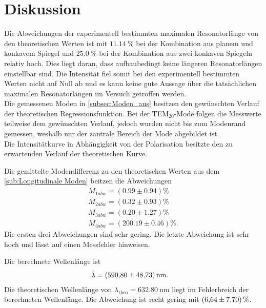 \section{Diskussion}
\label{sec:Diskussion}

Die Abweichungen der experimentell bestimmten maximalen Resonatorlänge von den theoretischen Werten ist mit $\qty{11.14}{\percent}$ bei der Kombination
aus planem und konkavem Spiegel und $\qty{25.0}{\percent}$ bei der Kombination aus zwei konkaven Spiegeln relativ hoch.
Dies liegt daran, dass aufbaubedingt keine längeren Resonatorlängen einstellbar sind. Die Intensität fiel somit bei den experimentell bestimmten
Werten nicht auf Null ab und es kann keine gute Aussage über die tatsächlichen maximalen Resonatorlängen im Versuch getroffen werden.\\

Die gemessenen Moden in \autoref{subsec:Moden_aus} besitzen den gewünschten Verlauf der theoretischen Regressionsfunktion. Bei der TEM$_{20}$-Mode folgen die Messwerte teilweise dem gewünschten 
Verlauf, jedoch wurden nicht bis zum Modenrand gemessen, weshalb nur der zantrale Bereich der Mode abgebildet ist.\\


Die Intensitätkurve in Abhängigkeit von der Polarisation besitzte den zu erwartenden Verlauf der theoretischen Kurve.

Die gemittelte Modendifferenz zu den theoretischen Werten aus dem \autoref{sub:Longitudinale Moden} beitzen die Abweichungen
\begin{align}
    M_{1 abw} = (0.99 \pm 0.94) \si{\percent}\\
    M_{2 abw} = (0.32 \pm 0.93) \si{\percent}\\
    M_{3 abw} = (0.20 \pm 1.27) \si{\percent}\\
    M_{4 abw} = (200.19 \pm 0.46) \si{\percent}.
\end{align}
Die ersten drei Abweichungen sind sehr gering. Die letzte Abweichung ist sehr hoch und lässt auf einen Messfehler hinweisen.

Die berechnete Wellenlänge ist 
\begin{align*}
    \bar{\lambda} &= \qty{590.80 \pm 48.73}{\nano\meter}.
\end{align*}
Die theoretischen Wellenlänge von $\lambda_{\text{theo}}= \qty{632.80}{\nano\meter}$ liegt im Fehlerbreich der berechneten Wellenlänge. Die Abweichung ist recht gering mit 
$\qty{6.64 \pm 7.70}{\percent}$.

